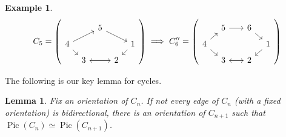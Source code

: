 \documentclass[11pt,reqno]{amsart}
\DeclareMathOperator{\Pic}{Pic}
\theoremstyle{definition}
\newtheorem{myeg}[mydef]{Example}
\theoremstyle{plain}
\newtheorem{lem}[mydef]{Lemma}
\begin{document}
\begin{myeg}
\[
C_5=\left( \begin{tikzcd}[row sep=0.2cm, column sep=0.2cm]
	& & 5 \arrow[drr] & &  \\ 
	4 \arrow[urr] \arrow[dr] & & & & 1 \arrow[dl] \\ 
	& 3 \arrow[rr] & & 2 \arrow[ll]& 
\end{tikzcd}\right)	
\implies C_6''= \left( \begin{tikzcd}[row sep=0.2cm, column sep=0.3cm]
	& 5 \arrow[rr]&  &6\arrow[dr] &  \\ 
	4  \arrow[dr] \arrow[ur] & & & & 1 \arrow[dl]  \\ 
	& 3 \arrow[rr] & & 2 \arrow[ll]& 
\end{tikzcd}\right)	
\] 
\end{myeg}

The following is our key lemma for cycles. 


\begin{lem} \label{lemma: key lemma for cycles}
Fix an orientation of $C_n$. If not every edge of $C_n$ (with a fixed orientation) is bidirectional, there is an orientation of $C_{n+1}$ such that $\Pic (C_n) \simeq \Pic (C_{n+1})$. 
\end{lem}
\end{document}

